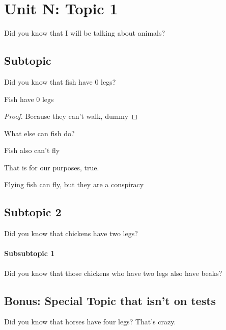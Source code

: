 \chapter{Unit N: Topic 1}
Did you know that I will be talking about animals?
\section{Subtopic}
Did you know that fish have 0 legs?
\begin{theorem}
    Fish have 0 legs
\end{theorem}
\begin{proof}
    Because they can't walk, dummy 
\end{proof}
What else can fish do?
\begin{lemma}
    Fish also can't fly
\end{lemma}
That is for our purposes, true.
\begin{remark}
    Flying fish can fly, but they are a conspiracy
\end{remark}
\section{Subtopic 2}
Did you know that chickens have two legs?
\subsubsection{Subsubtopic 1}
Did you know that those chickens who have two legs also have beaks?
\begin{subappendices}
    \section{Bonus: Special Topic that isn't on tests}
    Did you know that horses have four legs? That's crazy.
\end{subappendices}
